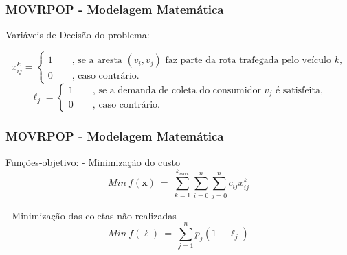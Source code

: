 \documentclass{beamer}
\begin{document}
\begin{frame}
 \frametitle{MOVRPOP - Modelagem Matemática}
 Variáveis de Decisão do problema:
 
 {\small
\begin{equation*}
 x^{k}_{ij} = \begin{cases}
               1 \qquad \textrm{, se a aresta $(v_i,v_j)$ faz parte da rota trafegada pelo veículo $k$,}\\
               0 \qquad \textrm{, caso contrário.}
              \end{cases}
\end{equation*}
\begin{equation*}
 \ell_{j} = \begin{cases}
           1 \qquad \textrm{, se a demanda de coleta do consumidor $v_j$ é satisfeita,}\\
           0 \qquad \textrm{, caso contrário.}
          \end{cases}
\end{equation*}
}
  
\end{frame}

\begin{frame}
 \frametitle{MOVRPOP - Modelagem Matemática}
 Funções-objetivo: \newline \newline
 - Minimização do custo
 \begin{equation}
\label{eq:modelagem_1}
Min ~f(\textbf{x}) ~=~ \sum^{k_{max}}_{k=1}\sum^{n}_{i=0}\sum^{n}_{j=0}c_{ij}x^{k}_{ij}
\end{equation}
%

 - Minimização das coletas não realizadas
\begin{equation}
\label{eq:modelagem_2}
Min ~f(\boldsymbol{\ell}) ~=~  \sum^{n}_{j=1}p_{j}(1-\ell_{j})
\end{equation}
  
\end{frame}
\end{document}
